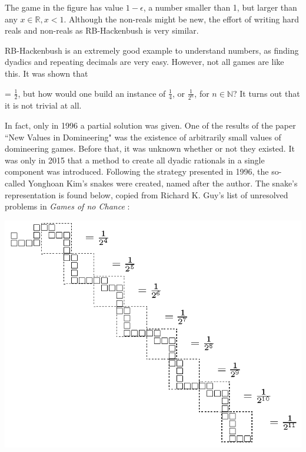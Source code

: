 The game in the figure has value $1-\epsilon$, a number smaller than 1, but larger than any $x \in \mathbb{R}, x < 1$. Although the non-reals might be new, the effort of writing hard reals and non-reals as RB-Hackenbush is very similar.

RB-Hackenbush is an extremely good example to understand numbers, as finding dyadics and repeating decimals are very easy. However, not all games are like this. It was shown that
 = $\frac{1}{2}$, but how would one build an instance of $\frac{1}{4}$, or $\frac{1}{2^n}$, for $n\in\mathbb{N}$? It turns out that it is not trivial at all.

In fact, only in 1996 a partial solution was given. One of the results of the paper ``New Values in Domineering" \cite{10} was the existence of arbitrarily small values of domineering games. Before that, it was unknown whether or not they existed. It was only in 2015 \cite{11} that a method to create all dyadic rationals in a single component was introduced. Following the strategy presented in 1996, the so-called Yonghoan Kim's snakes were created, named after the author. The snake's representation is found below, copied from Richard K. Guy's list of unresolved problems in \textit{Games of no Chance} \cite{GONC}:

\vspace{1cm}\hspace{-2cm}
\includegraphics[scale=0.9]{../images/kims_snakes.png}

